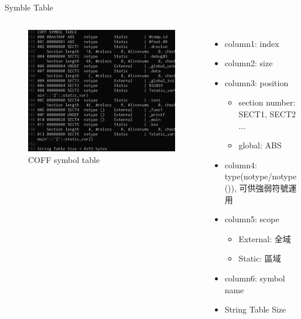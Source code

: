 \begin{frame}{Symble Table}
    \begin{columns}[t]
        \begin{figure}
            \begin{center}
                \includegraphics[width=\textwidth]{./image/symboltablesec.png}
                \caption{COFF symbol table}
            \end{center}
        \end{figure}
        \begin{itemize}
            \item column1: index
            \item column2: size
            \item column3: position
            \begin{itemize}
                \item section number: SECT1, SECT2 ...
                \item global: ABS
            \end{itemize}
            \item column4: type(notype/notype ()), 可供強弱符號運用
            \item column5: scope
            \begin{itemize}
                \item External: 全域
                \item Static: 區域
            \end{itemize}
            \item column6: symbol name
            \item String Table Size
        \end{itemize}
    \end{columns}
\end{frame}

